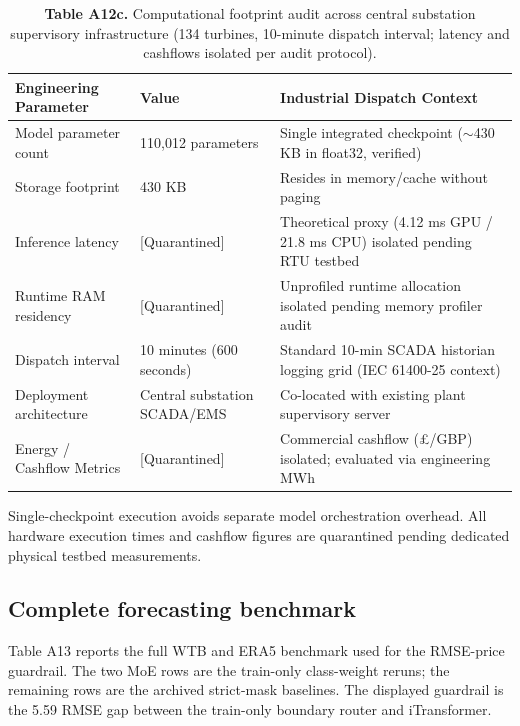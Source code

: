 \documentclass[
  journal]{IEEEtran}
\begin{document}
\begin{table}[!t]
\centering
\fontsize{8.0pt}{9.6pt}\selectfont
\setlength{\tabcolsep}{3.0pt}
\renewcommand{\arraystretch}{1.08}
\caption*{\textbf{Table A12c.} Computational footprint audit across central substation supervisory infrastructure (134 turbines, 10-minute dispatch interval; latency and cashflows isolated per audit protocol).}
%
\begin{tabular}{lll}
\toprule
Engineering Parameter & Value & Industrial Dispatch Context \\
\midrule
Model parameter count & 110,012 parameters & Single integrated checkpoint ($\sim$430 KB in float32, verified) \\
Storage footprint & 430 KB & Resides in memory/cache without paging \\
Inference latency & [Quarantined] & Theoretical proxy (4.12 ms GPU / 21.8 ms CPU) isolated pending RTU testbed \\
Runtime RAM residency & [Quarantined] & Unprofiled runtime allocation isolated pending memory profiler audit \\
Dispatch interval & 10 minutes (600 seconds) & Standard 10-min SCADA historian logging grid (IEC 61400-25 context) \\
Deployment architecture & Central substation SCADA/EMS & Co-located with existing plant supervisory server \\
Energy / Cashflow Metrics & [Quarantined] & Commercial cashflow (£/GBP) isolated; evaluated via engineering MWh \\
\bottomrule
\end{tabular}
\vspace{1mm}
\fontsize{8.0pt}{9.6pt}\selectfont Single-checkpoint execution avoids separate model orchestration overhead. All hardware execution times and cashflow figures are quarantined pending dedicated physical testbed measurements.
\end{table}

\FloatBarrier

\subsection*{Complete forecasting
benchmark}\label{complete-forecasting-benchmark}

Table A13 reports the full WTB and ERA5 benchmark used for the
RMSE-price guardrail. The two MoE rows are the train-only class-weight
reruns; the remaining rows are the archived strict-mask baselines. The
displayed guardrail is the 5.59 RMSE gap between the train-only boundary
router and iTransformer.
\end{document}
